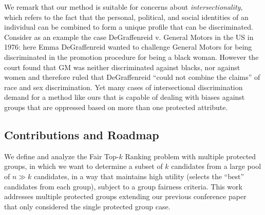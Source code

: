 %
%
%
%
%
%


We remark that our method is suitable for concerns about \emph{intersectionality}, which refers to the fact that the personal, political, and social identities of an individual can be combined to form a unique profile that can be discriminated.
%
Consider as an example the case DeGraffenreid v. General Motors in the US in 1976: here Emma DeGraffenreid wanted to challenge General Motors for being discriminated in the promotion procedure for being a black woman.
%
However the court found that GM was neither discriminated against blacks, nor against women and therefore ruled that DeGraffenreid ``could not combine the claims'' of race and sex discrimination.
%
Yet many cases of intersectional discrimination demand for a method like ours that is capable of dealing with biases against groups that are oppressed based on more than one protected attribute.

\subsection{Contributions and Roadmap}
We define and analyze the {\sc Fair Top-$k$ Ranking problem} with multiple protected groups, in which we want to determine a subset of $k$ candidates from a large pool of $n \gg k$ candidates, in a way that maintains high utility (selects the ``best'' candidates from each group), subject to a group fairness criteria. This work addresses multiple protected groups extending our previous conference paper~\cite{zehlike2017fair} that only considered the single protected group case.
%
%

